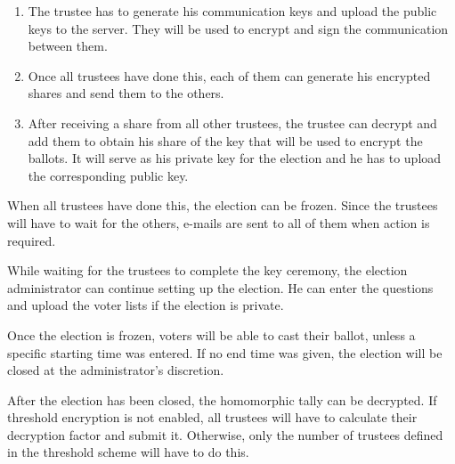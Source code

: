 \begin{enumerate}
  \item The trustee has to generate his communication keys and upload the public keys to the server. They will be used to encrypt and sign the communication between them.
  \item Once all trustees have done this, each of them can generate his encrypted shares and send them to the others.
  \item After receiving a share from all other trustees, the trustee can decrypt and add them to obtain his share of the key that will be used to encrypt the ballots. It will serve as his private key for the election and he has to upload the corresponding public key.
\end{enumerate}

\par When all trustees have done this, the election can be frozen. Since the trustees will have to wait for the others, e-mails are sent to all of them when action is required.

\par While waiting for the trustees to complete the key ceremony, the election administrator can continue setting up the election. He can enter the questions and upload the voter lists if the election is private.

\par Once the election is frozen, voters will be able to cast their ballot, unless a specific starting time was entered. If no end time was given, the election will be closed at the administrator's discretion.

\par After the election has been closed, the homomorphic tally can be decrypted. If threshold encryption is not enabled, all trustees will have to calculate their decryption factor and submit it. Otherwise, only the number of trustees defined in the threshold scheme will have to do this.
